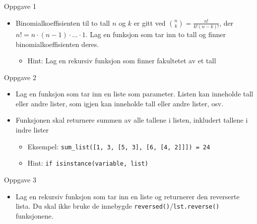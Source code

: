\documentclass[screen, aspectratio=169]{beamer}
\begin{document}
\begin{frame}{Oppgave 1}
	\begin{itemize}
		\item<+-> Binomialkoeffisienten til to tall $n$ og $k$ er gitt ved $\binom{n}{k} = \frac{n!}{k!(n-k)!}$, der $n! = n \cdot (n - 1) \cdot ... \cdot 1$. Lag en funksjon som tar inn to tall og finner binomialkoeffisienten deres.
		\begin{itemize}
			\item Hint: Lag en rekursiv funksjon som finner fakultetet av et tall
		\end{itemize}
	\end{itemize}
\end{frame}

\begin{frame}[fragile]{Oppgave 2}
	\begin{itemize}
		\item Lag en funksjon som tar inn en liste som parameter. Listen kan inneholde tall eller andre lister, som igjen kan inneholde tall eller andre lister, osv.
		\item Funksjonen skal returnere summen av alle tallene i listen, inkludert tallene i indre lister
		\begin{itemize}
			\item Eksempel: \lstinline|sum_list([1, 3, [5, 3], [6, [4, 2]]]) = 24|
			\item Hint: \lstinline|if isinstance(variable, list)|
		\end{itemize}
	\end{itemize}
\end{frame}

\begin{frame}{Oppgave 3}
	\begin{itemize}
		\item Lag en rekursiv funksjon som tar inn en liste og returnerer den reverserte lista. Du skal ikke bruke de innebygde \lstinline|reversed()|/\lstinline|lst.reverse()| funksjonene.
	\end{itemize}
\end{frame}
\end{document}
